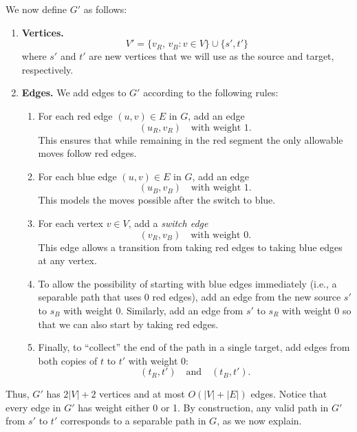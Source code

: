 \documentclass[11pt]{article}
\begin{document}
    We now define \(G'\) as follows:
    \begin{enumerate}
      \item \textbf{Vertices.}  
        \[
          V' = \{ v_R,\, v_B : v\in V \} \cup \{s',t'\}
        \]
        where \(s'\) and \(t'\) are new vertices that we will use as the source and target, respectively.
      
      \item \textbf{Edges.} We add edges to \(G'\) according to the following rules:
      \begin{enumerate}
        \item For each red edge \((u,v) \in E\) in \(G\), add an edge 
          \[
            (u_R, v_R) \quad \text{with weight } 1.
          \]
          This ensures that while remaining in the red segment the only allowable moves follow red edges.
          
        \item For each blue edge \((u,v) \in E\) in \(G\), add an edge
          \[
            (u_B, v_B) \quad \text{with weight } 1.
          \]
          This models the moves possible after the switch to blue.
          
        \item For each vertex \(v\in V\), add a \emph{switch edge}
          \[
            (v_R, v_B) \quad \text{with weight } 0.
          \]
          This edge allows a transition from taking red edges to taking blue edges at any vertex.
          
        \item To allow the possibility of starting with blue edges immediately (i.e., a separable path that uses 0 red edges), add an edge from the new source \(s'\) to \(s_B\) with weight 0. Similarly, add an edge from \(s'\) to \(s_R\) with weight 0 so that we can also start by taking red edges.
        
        \item Finally, to “collect” the end of the path in a single target, add edges from both copies of \(t\) to \(t'\) with weight 0:
          \[
            (t_R, t') \quad \text{and} \quad (t_B, t').
          \]
      \end{enumerate}
    \end{enumerate}
    
    \medskip
    Thus, \(G'\) has \(2|V|+2\) vertices and at most \(O(|V|+|E|)\) edges. Notice that every edge in \(G'\) has weight either 0 or 1. By construction, any valid path in \(G'\) from \(s'\) to \(t'\) corresponds to a separable path in \(G\), as we now explain.
    
\end{document}
